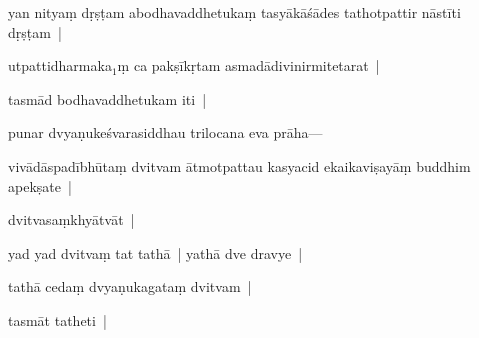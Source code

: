 \documentclass[article,12pt,a4paper]{memoir}%
\newcommand{\persName}[1]{#1}
\newcounter{parCount}
\begin{document}
	  
	  \pstart \leavevmode%
	yan nityaṃ dṛṣṭam abodhavaddhetukaṃ tasyākāśādes tathotpattir nāstīti dṛṣṭam |
	{}
	\pend%
      

	  
	  \pstart \leavevmode%
	utpattidharmaka{\tiny $_{1}$}ṃ ca pakṣīkṛtam asmadādivinirmitetarat |
	{}
	\pend%
      

	  
	  \pstart \leavevmode%
	tasmād bodhavaddhetukam iti |\label{sarit__ratnakīrtinibandhāvali__105213}
	{}
	\pend%
      

	  
	  \pstart \leavevmode%
	\label{thakur75-40.1}punar dvyaṇukeśvarasiddhau \persName{trilocana} eva prāha—
	{}
	\pend%
      

	  
	  \pstart \leavevmode%
	vivādāspadībhūtaṃ dvitvam ātmotpattau kasyacid ekaikaviṣayāṃ buddhim apekṣate |
	{}
	\pend%
      

	  
	  \pstart \leavevmode%
	dvitvasaṃkhyātvāt |
	{}
	\pend%
      

	  
	  \pstart \leavevmode%
	yad yad dvitvaṃ tat tathā | yathā dve dravye |
	{}
	\pend%
      

	  
	  \pstart \leavevmode%
	tathā cedaṃ dvyaṇukagataṃ dvitvam |
	{}
	\pend%
      

	  
	  \pstart \leavevmode%
	tasmāt tatheti |
	{}
	\pend%
      
\end{document}
